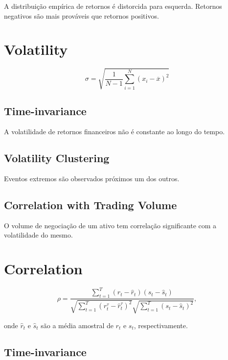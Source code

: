 \documentclass[]{book}
\theoremstyle{definition}
\theoremstyle{definition}
\theoremstyle{definition}
\theoremstyle{remark}
\begin{document}
A distribuição empírica de retornos é distorcida para esquerda. Retornos
negativos são mais prováveis que retornos positivos.

\section{Volatility}\label{volatility}

\begin{equation}
 \sigma = \sqrt{ \frac{1}{N-1} \sum_{i=1}^N (x_i - \overline{x})^2}
\label{eq:sd}
\end{equation}

\subsection{Time-invariance}\label{time-invariance}

A volatilidade de retornos financeiros não é constante ao longo do
tempo.

\subsection{Volatility Clustering}\label{volatility-clustering}

Eventos extremos são observados próximos um dos outros.

\subsection{Correlation with Trading
Volume}\label{correlation-with-trading-volume}

O volume de negociação de um ativo tem correlação significante com a
volatilidade do mesmo.

\section{Correlation}\label{correlation}

\begin{equation}
\label{eq:correlation}
\rho = \frac{\sum\limits_{t=1}^{T} (r_t - \hat{r}_t)(s_t - \hat{s}_t)}{\sqrt{\sum\limits_{t=1}^{T} (r_t^{\tau} - \hat{r}_t^{\tau})^2}\sqrt{\sum\limits_{t=1}^{T}(s_t - \hat{s}_t)^2}},
\end{equation}

onde \(\hat{r}_t\) e \(\hat{s}_t\) são a média amostral de \(r_t\) e
\(s_t\), respectivamente.

\subsection{Time-invariance}\label{time-invariance-1}
\end{document}
